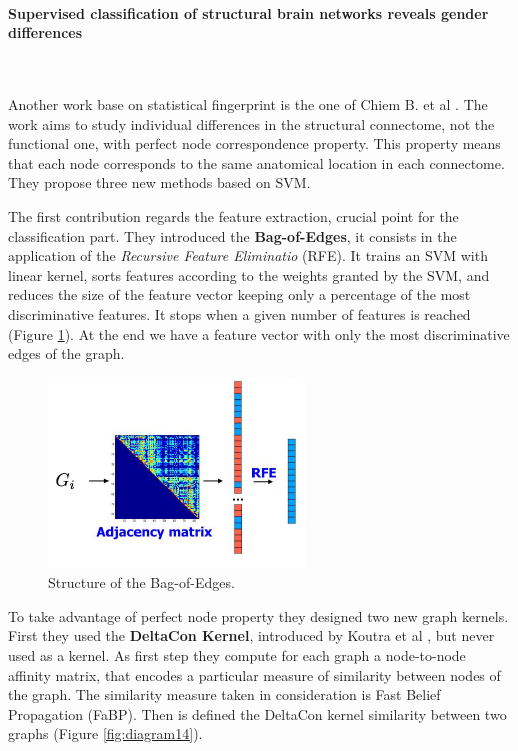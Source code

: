 \paragraph{Supervised classification of structural brain networks reveals gender differences}\
\vspace{0.5cm}

Another work base on statistical fingerprint is the one of Chiem B. et al \cite{8379106}. The work aims to study individual differences in the structural connectome, not the functional one, with perfect node correspondence property. This property means that each node corresponds to the same anatomical location in each connectome. They propose three new methods based on SVM.
\vspace{0.5cm}

The first contribution regards the feature extraction, crucial point for the classification part. They introduced the \textbf{Bag-of-Edges}, it consists in the application of the \textit{Recursive Feature Eliminatio} (RFE). It trains an SVM with linear kernel, sorts features according to the weights granted by the SVM, and reduces the size of the feature vector keeping only a percentage of the most discriminative features. It stops when a given number of features is reached (Figure \ref{fig:diagram13}). At the end we have a feature vector with only the most discriminative edges of the graph.
\vspace{0.5cm}

\begin{figure}[htbp]
	\centering
	\includegraphics[scale=0.8]{Immagini/supervised1.PNG}
	\caption{Structure of the Bag-of-Edges.}
	\label{fig:diagram13}
\end{figure}
 
To take advantage of perfect node property they designed two new graph kernels. First they used the \textbf{DeltaCon Kernel}, introduced by Koutra et al \cite{koutra2013deltacon}, but never used as a kernel. As first step they compute for each graph a node-to-node affinity matrix, that encodes a particular measure of similarity between nodes of the graph. The similarity measure taken in consideration is Fast Belief Propagation (FaBP). Then is defined the DeltaCon kernel similarity between two graphs (Figure \ref{fig:diagram14}). 
\vspace{0.5cm}

